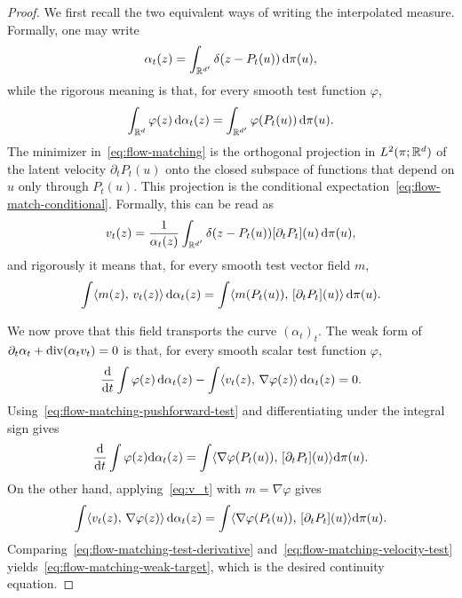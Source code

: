 \begin{proof}
	We first recall the two equivalent ways of writing the interpolated measure. Formally, one may write
	\[
		\alpha_t(z)=\int_{\mathbb{R}^{d'}}\delta(z-P_t(u))\,\mathrm{d}\pi(u),
	\]
	while the rigorous meaning is that, for every smooth test function $\varphi$,
	\begin{equation}\label{eq:flow-matching-pushforward-test}
\index{push-forward}%
		\int_{\RR^d}\varphi(z)\,\d\alpha_t(z)
		=
		\int_{\RR^{d'}}\varphi(P_t(u))\,\d\pi(u).
	\end{equation}
	The minimizer in~\eqref{eq:flow-matching} is the orthogonal projection in $L^2(\pi;\mathbb{R}^d)$ of the latent velocity $\partial_tP_t(u)$ onto the closed subspace of functions that depend on $u$ only through $P_t(u)$. This projection is the conditional expectation~\eqref{eq:flow-match-conditional}. Formally, this can be read as
	\[
		v_t(z)=\frac{1}{\alpha_t(z)}
		\int_{\mathbb{R}^{d'}}\delta(z-P_t(u))[\partial_tP_t](u)\,\mathrm{d}\pi(u),
	\]
	and rigorously it means that, for every smooth test vector field $m$,
	\begin{equation}\label{eq:v_t}
		\int \langle m(z),\,v_t(z)\rangle \, \mathrm{d}\alpha_t(z)
		=
		\int \langle m(P_t(u)),\,[\partial_t P_t](u)\rangle \, \mathrm{d}\pi(u).
	\end{equation}

	We now prove that this field transports the curve $(\alpha_t)_t$. The weak form of
	$\partial_t\alpha_t+\operatorname{div}(\alpha_t v_t)=0$ is that, for every smooth scalar test function $\varphi$,
	\begin{equation}\label{eq:flow-matching-weak-target}
		\frac{\mathrm{d}}{\mathrm{d} t}\int\varphi(z)\,\mathrm{d}\alpha_t(z)
		-
		\int\langle v_t(z),\,\nabla\varphi(z)\rangle\,\mathrm{d}\alpha_t(z)
		=0.
	\end{equation}
	Using~\eqref{eq:flow-matching-pushforward-test} and differentiating under the integral sign gives
	\begin{equation}\label{eq:flow-matching-test-derivative}
		\frac{\mathrm{d}}{\mathrm{d} t}\int \varphi(z)\mathrm{d}\alpha_t(z)
		=
		\int \langle \nabla\varphi(P_t(u)),\,[\partial_t P_t](u)\rangle\mathrm{d}\pi(u).
	\end{equation}
	On the other hand, applying~\eqref{eq:v_t} with $m=\nabla\varphi$ gives
	\begin{equation}\label{eq:flow-matching-velocity-test}
		\int\langle v_t(z),\,\nabla\varphi(z)\rangle\,\mathrm{d}\alpha_t(z)
		=
		\int \langle \nabla\varphi(P_t(u)),\,[\partial_t P_t](u)\rangle\mathrm{d}\pi(u).
	\end{equation}
	Comparing~\eqref{eq:flow-matching-test-derivative} and~\eqref{eq:flow-matching-velocity-test} yields~\eqref{eq:flow-matching-weak-target}, which is the desired continuity equation.
\end{proof}


